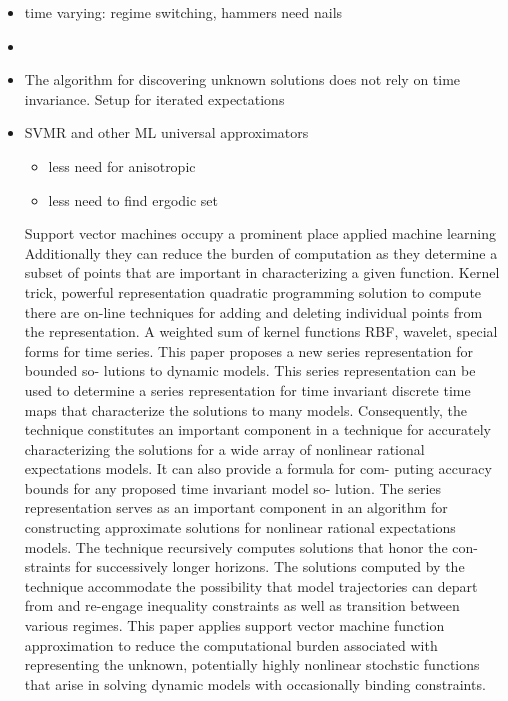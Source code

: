 \documentclass[12pt]{article}
\begin{document}
\begin{itemize}
\item time varying:  regime switching, hammers need nails
\item   \item The algorithm for discovering unknown solutions does not rely on time invariance.  Setup for iterated expectations
\item SVMR and other ML universal approximators


  \begin{itemize}
  \item less need for anisotropic
  \item less need to find ergodic set
  \end{itemize}




Support vector machines occupy a prominent place applied machine learning
Additionally they can reduce the burden of computation as they determine 
a subset of points that are important in characterizing a given function.
Kernel trick,  powerful representation quadratic programming solution to compute there are on-line techniques for adding and deleting individual points from the representation.  A weighted sum of kernel functions RBF, wavelet, special forms for time series.
  This paper proposes a new series representation for bounded so-
lutions to dynamic models. This series representation can be used
to determine a series representation for time invariant discrete time
maps that characterize the solutions to many models. Consequently,
the technique constitutes an important component in a technique for
accurately characterizing the solutions for a wide array of nonlinear
rational expectations models. It can also provide a formula for com-
puting accuracy bounds for any proposed time invariant model so-
lution. The series representation serves as an important component
in an algorithm for constructing approximate solutions for nonlinear
rational expectations models.
The technique recursively computes solutions that honor the con-
straints for successively longer horizons.  The solutions computed by
the technique accommodate the possibility that model trajectories can
depart from and re-engage inequality constraints as well as transition
between various regimes.
This paper applies support vector machine function approximation to
reduce the computational burden associated with representing the
unknown, potentially highly nonlinear stochstic functions that arise in
solving dynamic models with occasionally binding constraints.



\end{itemize}
\end{document}
